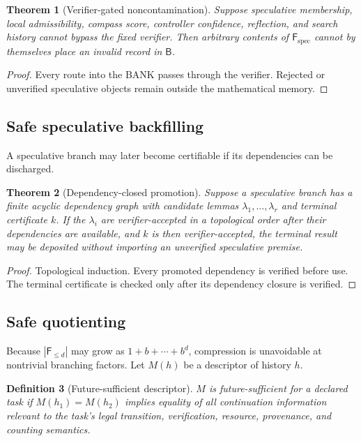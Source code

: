 \documentclass[11pt]{article}
\newtheorem{theorem}{Theorem}[section]
\newtheorem{definition}[theorem]{Definition}
\newcommand{\Bank}{\mathsf{B}}
\newcommand{\Future}{\mathsf{F}}
\begin{document}
\begin{theorem}[Verifier-gated noncontamination]
Suppose speculative membership, local admissibility, compass score, controller confidence, reflection, and search history cannot bypass the fixed verifier. Then arbitrary contents of $\Future_{\mathrm{spec}}$ cannot by themselves place an invalid record in $\Bank$.
\end{theorem}
\begin{proof}
Every route into the BANK passes through the verifier. Rejected or unverified speculative objects remain outside the mathematical memory.
\end{proof}

\subsection{Safe speculative backfilling}

A speculative branch may later become certifiable if its dependencies can be discharged.

\begin{theorem}[Dependency-closed promotion]
Suppose a speculative branch has a finite acyclic dependency graph with candidate lemmas $\lambda_1,\ldots,\lambda_r$ and terminal certificate $k$. If the $\lambda_i$ are verifier-accepted in a topological order after their dependencies are available, and $k$ is then verifier-accepted, the terminal result may be deposited without importing an unverified speculative premise.
\end{theorem}
\begin{proof}
Topological induction. Every promoted dependency is verified before use. The terminal certificate is checked only after its dependency closure is verified.
\end{proof}

\subsection{Safe quotienting}

Because $|\Future_{\le d}|$ may grow as $1+b+\cdots+b^d$, compression is unavoidable at nontrivial branching factors. Let $M(h)$ be a descriptor of history $h$.

\begin{definition}[Future-sufficient descriptor]
$M$ is future-sufficient for a declared task if $M(h_1)=M(h_2)$ implies equality of all continuation information relevant to the task's legal transition, verification, resource, provenance, and counting semantics.
\end{definition}
\end{document}
